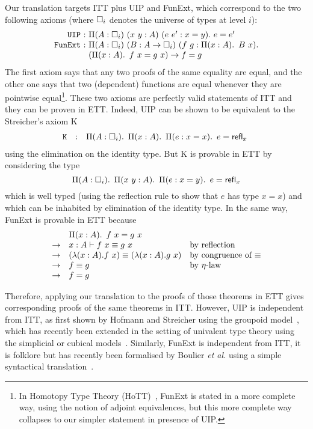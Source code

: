 Our translation targets ITT plus UIP and FunExt,
which correspond to the two following axioms (where $\square_{i}$ denotes
the universe of types at level $i$):
$$
\begin{array}{r@{~}c@{~}l}
\mathtt{UIP} & : & \Pi(A: \Ty{i})\ (x \ y:A)\ (e \ e' : x = y).\ e = e' \\
\mathtt{FunExt} & : & \Pi(A : \Ty{i})\ (B : A \to \Ty{i})\
(f \ g : \Prod{x:A} B\ x). \\
&& (\Prod{x : A} f\ x = g\ x) \to f = g
\end{array}
$$
%
The first axiom says that any two proofs of the same equality are
equal, and the other one says that two (dependent) functions are equal
whenever they are pointwise equal\footnote{In Homotopy Type
  Theory (HoTT)~\cite{hottbook}, FunExt is
  stated in a more complete way, using the notion of adjoint
  equivalences, but this more complete way collapses to our simpler
  statement in presence of UIP.}.
%
These two axioms are perfectly valid statements of ITT and they can be
proven in ETT.
%
Indeed, UIP can be shown to be equivalent to the Streicher's axiom K
$$
\begin{array}{rcl}
\mathtt{K} & : & \mathop{\Pi(A: \square_{i}).\ } \mathop{\Pi(x :A).\ } \mathop{\Pi(e : x = x).\ } e = {\mathsf{refl}}_{x}\  \\
\end{array}
$$
using the elimination on the identity type. But K is provable in ETT
by considering the type
$$
\mathop{\Pi(A: \square_{i}).\ } \mathop{\Pi(x \ y:A).\ } \mathop{\Pi(e : x = y).\ } e = {\mathsf{refl}}_{x}\  \\
$$
which is well typed (using the reflection rule to show that $e$ has
type $x= x$) and which can be inhabited by elimination of the identity
type.
%
In the same way, FunExt is provable in ETT because
$$
\begin{array}{cll}
&\mathop{\Pi(x : A).\ } f\ x = g\ x \\
\to & x : A \vdash f\ x \equiv g\ x &
\mbox{by reflection} \\
\to &  (\lambda (x:A). {f \ x}) \equiv (\lambda{(x:A)}.{g \ x}) &
\mbox{by congruence of $\equiv$} \\
\to &  f \equiv g & \mbox{by $\eta$-law} \\
\to &  f = g
\end{array}
$$

Therefore, applying our translation to the proofs of those theorems in ETT
gives corresponding proofs of the same theorems in ITT.
%
However, UIP is independent from ITT, as first shown by Hofmann and
Streicher using the groupoid model~\cite{groupoid-interp}, which has
recently been extended in the setting of univalent type theory using
the simplicial or cubical models~\cite{kapulkin2012simplicial,coquand:cubical}.
%
Similarly, FunExt is independent from ITT,
it is folklore but has recently been formalised by Boulier \emph{et al.} using a
simple syntactical translation~\cite{boulier17:next-syntac-model-type-theor}.

